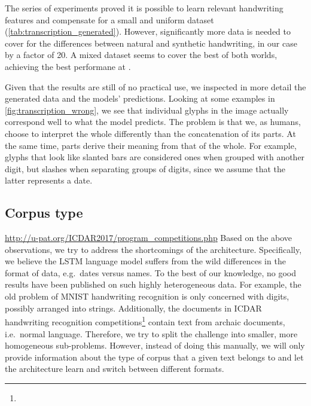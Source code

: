 			The series of experiments proved it is possible to learn relevant handwriting features and compensate for a small and uniform dataset (\autoref{tab:transcription_generated}).  However, significantly more data is needed to cover for the differences between natural and synthetic handwriting, in our case by a factor of 20. A mixed dataset seems to cover the best of both worlds, achieving the best performane at .

			Given that the results are still of no practical use, we inspected in more detail the generated data and the models' predictions. Looking at some examples in \autoref{fig:transcription_wrong}, we see that individual glyphs in the image actually correspond well to what the model predicts. The problem is that we, as humans, choose to interpret the whole differently than the concatenation of its parts. At the same time, parts derive their meaning from that of the whole. For example, glyphs that look like slanted bars are considered ones when grouped with another digit, but slashes when separating groups of digits, since we assume that the latter represents a date.


	\subsection{Corpus type}

			\urldef{\ICDAR}\url{http://u-pat.org/ICDAR2017/program_competitions.php}
			Based on the above observations, we try to address the shortcomings of the architecture. Specifically, we believe the LSTM language model suffers from the wild differences in the format of data, e.g.\ dates versus names. To the best of our knowledge, no good results have been published on such highly heterogeneous data. For example, the old problem of MNIST handwriting recognition is only concerned with digits, possibly arranged into strings. Additionally, the documents in ICDAR handwriting recognition competitions\footnote{\ICDAR} contain text from archaic documents, i.e.\ normal language. Therefore, we try to split the challenge into smaller, more homogeneous sub-problems. However, instead of doing this manually, we will only provide information about the type of corpus that a given text belongs to and let the architecture learn and switch between different formats.

